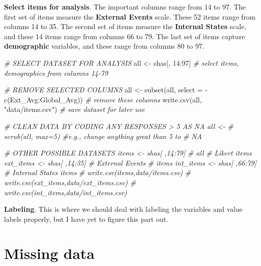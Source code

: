 \documentclass[
]{report}
\newenvironment{Shaded}{\begin{snugshade}}{\end{snugshade}}
\newcommand{\AttributeTok}[1]{\textcolor[rgb]{0.77,0.63,0.00}{#1}}
\newcommand{\CommentTok}[1]{\textcolor[rgb]{0.56,0.35,0.01}{\textit{#1}}}
\newcommand{\DecValTok}[1]{\textcolor[rgb]{0.00,0.00,0.81}{#1}}
\newcommand{\FunctionTok}[1]{\textcolor[rgb]{0.00,0.00,0.00}{#1}}
\newcommand{\NormalTok}[1]{#1}
\newcommand{\OtherTok}[1]{\textcolor[rgb]{0.56,0.35,0.01}{#1}}
\newcommand{\SpecialCharTok}[1]{\textcolor[rgb]{0.00,0.00,0.00}{#1}}
\newcommand{\StringTok}[1]{\textcolor[rgb]{0.31,0.60,0.02}{#1}}
\begin{document}
\textbf{Select items for analysis}. The important columns range from 14 to 97. The first set of items measure the \textbf{External Events} scale. These 52 items range from columns 14 to 35. The second set of items measure the \textbf{Internal States} scale, and these 14 items range from columns 66 to 79. The last set of items capture \textbf{demographic} variables, and these range from columns 80 to 97.

\begin{Shaded}
\begin{Highlighting}[]
\CommentTok{\# SELECT DATASET FOR ANALYSIS}
\NormalTok{all }\OtherTok{\textless{}{-}}\NormalTok{ shas[, }\DecValTok{14}\SpecialCharTok{:}\DecValTok{97}\NormalTok{]  }\CommentTok{\# select items, demographics from columns 14{-}79}

\CommentTok{\# REMOVE SELECTED COLUMNS}
\NormalTok{all }\OtherTok{\textless{}{-}} \FunctionTok{subset}\NormalTok{(all, }\AttributeTok{select =} \SpecialCharTok{{-}}\FunctionTok{c}\NormalTok{(Ext\_Avg}\SpecialCharTok{:}\NormalTok{Global\_Avg))  }\CommentTok{\# remove these columns}
\FunctionTok{write.csv}\NormalTok{(all, }\StringTok{"data/items.csv"}\NormalTok{)  }\CommentTok{\# save dataset for later use}

\CommentTok{\# CLEAN DATA BY CODING ANY RESPONSES \textgreater{} 5 AS NA all \textless{}{-}}
\CommentTok{\# scrub(all, max=5) \#e.g., change anything great than 5 to}
\CommentTok{\# NA}

\CommentTok{\# OTHER POSSIBLE DATASETS items \textless{}{-} shas[ ,14:79] \# all}
\CommentTok{\# Likert items ext\_items \textless{}{-} shas[ ,14:35] \# External Events}
\CommentTok{\# items int\_items \textless{}{-} shas[ ,66:79] \# Internal States items}
\CommentTok{\# write.csv(items,\textquotesingle{}data/items.csv\textquotesingle{})}
\CommentTok{\# write.csv(ext\_items,\textquotesingle{}data/ext\_items.csv\textquotesingle{})}
\CommentTok{\# write.csv(int\_items,\textquotesingle{}data/int\_items.csv\textquotesingle{})}
\end{Highlighting}
\end{Shaded}

\textbf{Labeling}. This is where we should deal with labeling the variables and value labels properly, but I have yet to figure this part out.

\hypertarget{missing-data}{%
\section{Missing data}\label{missing-data}}
\end{document}

